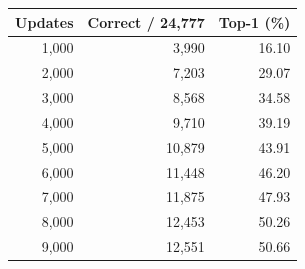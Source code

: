 \begin{tabular}{rrr}
\hline
Updates & Correct / 24,777 & Top-1 (\%) \\
\hline
1,000 & 3,990 & 16.10 \\
2,000 & 7,203 & 29.07 \\
3,000 & 8,568 & 34.58 \\
4,000 & 9,710 & 39.19 \\
5,000 & 10,879 & 43.91 \\
6,000 & 11,448 & 46.20 \\
7,000 & 11,875 & 47.93 \\
8,000 & 12,453 & 50.26 \\
9,000 & 12,551 & 50.66 \\
\hline
\end{tabular}
